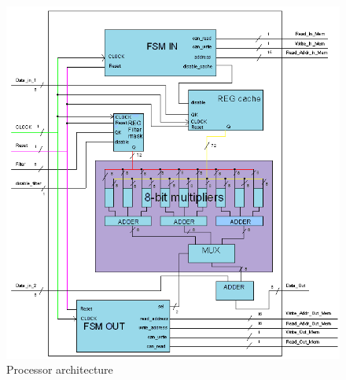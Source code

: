 \documentclass[11pt,a4paper]{article}
\begin{document}
\begin{figure}[h]
	\centering
		\includegraphics[width=6in]{./images/insideproc.PNG}
	\caption{Processor architecture}	\label{fig:procdetail}
\end{figure}
\end{document}
